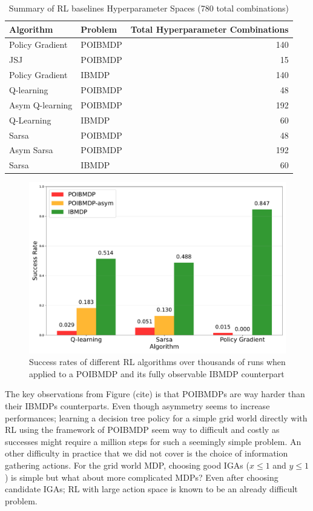 \begin{table}[h]
    \centering
    \caption{Summary of RL baselines Hyperparameter Spaces (780 total combinations)}
    \begin{tabular}{llr}
    \toprule
    \textbf{Algorithm} & \textbf{Problem} & \textbf{Total Hyperparameter Combinations} \\
    \midrule
    Policy Gradient & POIBMDP & 140 \\
    JSJ & POIBMDP & 15 \\
    Policy Gradient & IBMDP & 140 \\
    Q-learning & POIBMDP &48 \\
    Asym Q-learning & POIBMDP & 192 \\
    Q-Learning & IBMDP & 60 \\
    Sarsa & POIBMDP & 48 \\
    Asym Sarsa & POIBMDP & 192 \\
    Sarsa & IBMDP & 60 \\
    \bottomrule
    \end{tabular}
    \end{table}


\begin{figure}
    \centering
    \includegraphics[width=1\textwidth]{images/images_part1/algorithm_performance_comparison_flattened.pdf}
    \caption{Success rates of different RL algorithms over thousands of runs when applied to a POIBMDP and its fully observable IBMDP counterpart}\label{fig:po-vs-ib}
\end{figure}

The key observations from Figure (cite) is that POIBMDPs are way harder than their IBMDPs counterparts.
Even though asymmetry seems to increase performances; learning a decision tree policy for a simple grid world directly with RL using the framework of POIBMDP seem way to difficult and costly as successes might require a million steps for such a seemingly simple problem.
An other difficulty in practice that we did not cover is the choice of information gathering actions.
For the grid world MDP, choosing good IGAs ($x\leq1$ and $y\leq1$) is simple but what about more complicated MDPs? 
Even after choosing candidate IGAs; RL with large action space is known to be an already difficult problem.


